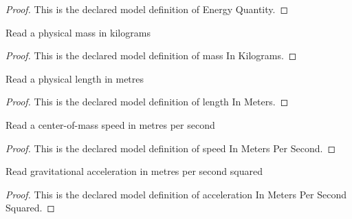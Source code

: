 \begin{proof}
  This is the declared model definition of Energy Quantity.
\end{proof}
\begin{definition}
  \label{def:physics:phyx-mini-0824:phyxminiproblems-problemphyxmini0824-massinkilograms}
  Read a physical mass in kilograms
\end{definition}
\begin{proof}
  This is the declared model definition of mass In Kilograms.
\end{proof}
\begin{definition}
  \label{def:physics:phyx-mini-0824:phyxminiproblems-problemphyxmini0824-lengthinmeters}
  Read a physical length in metres
\end{definition}
\begin{proof}
  This is the declared model definition of length In Meters.
\end{proof}
\begin{definition}
  \label{def:physics:phyx-mini-0824:phyxminiproblems-problemphyxmini0824-speedinmeterspersecond}
  Read a center-of-mass speed in metres per second
\end{definition}
\begin{proof}
  This is the declared model definition of speed In Meters Per Second.
\end{proof}
\begin{definition}
  \label{def:physics:phyx-mini-0824:phyxminiproblems-problemphyxmini0824-accelerationinmeterspersecondsquared}
  Read gravitational acceleration in metres per second squared
\end{definition}
\begin{proof}
  This is the declared model definition of acceleration In Meters Per Second Squared.
\end{proof}
